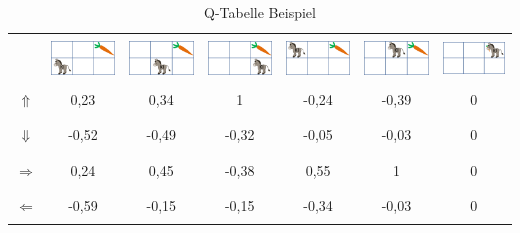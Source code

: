 \documentclass[12pt,titlepage]{article}
\begin{document}
\begin{table}
[ht] \caption{Q-Tabelle Beispiel} \label{tab:QTB}
\begin{tabular}{|c|c|c|c|c|c|c|}
\hline
&&&&&&\\
& \includegraphics[width=1.8cm]{p1.png} & \includegraphics[width=1.8cm]{p2.png} & \includegraphics[width=1.8cm]{p3.png} & \includegraphics[width=1.8cm]{p4.png} & \includegraphics[width=1.8cm]{p5.png} & \includegraphics[width=1.8cm]{p6.png} \\
\hline
&&&&&&\\
{\huge $\Uparrow$} & 0,23 & 0,34 & 1 & -0,24 & -0,39 & 0\\
&&&&&&\\
\hline
&&&&&&\\
{\huge $\Downarrow$} & -0,52 & -0,49 & -0,32 & -0,05 & -0,03 & 0\\
&&&&&&\\
\hline
&&&&&&\\
{\huge $\Rightarrow$} & 0,24 & 0,45 & -0,38 & 0,55 & 1 & 0\\
&&&&&&\\
\hline
&&&&&&\\
{\huge $\Leftarrow$} & -0,59 & -0,15 & -0,15 & -0,34 & -0,03 & 0\\
&&&&&&\\
\hline
\end{tabular}
\end{table}
\end{document}
